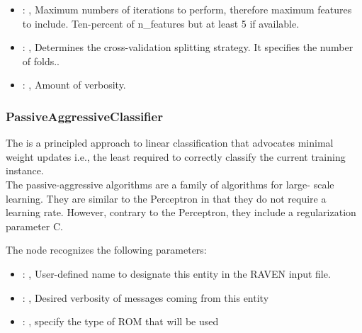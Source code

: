 \begin{itemize}
    \item {}: ,
      Maximum numbers of iterations to perform, therefore maximum
      features to include. Ten-percent of n\_features but at least 5 if available.

    \item {}: ,
      Determines the cross-validation splitting strategy.
      It specifies the number of folds..

    \item {}: ,
      Amount of verbosity.
  \end{itemize}


\subsubsection{PassiveAggressiveClassifier}
  The                          is a principled approach to
  linear                         classification that advocates minimal weight updates i.e., the
  least required                         to correctly classify the current training instance.
  \\The passive-aggressive algorithms are a family of algorithms for                         large-
  scale learning. They are similar to the Perceptron in that they                         do not
  require a learning rate. However, contrary to the Perceptron,                         they include
  a regularization parameter C.

  The  node recognizes the following parameters:
    \begin{itemize}
      \item {}: ,
        User-defined name to designate this entity in the RAVEN input file.
      \item {}: ,
        Desired verbosity of messages coming from this entity
      \item {}: ,
        specify the type of ROM that will be used
  \end{itemize}

